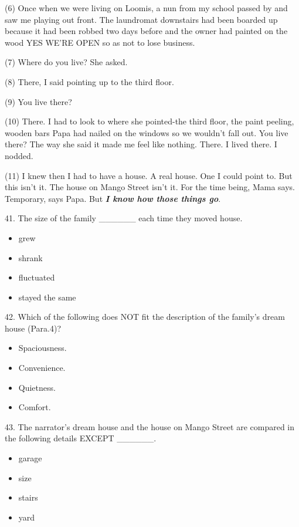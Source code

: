 \documentclass[UTF8,11pt]{ctexart}
\begin{document}
(6) Once when we were living on Loomis, a nun from my school passed by and saw me playing out front. The laundromat downstairs had been boarded up because it had been robbed two days before and the owner had painted on the wood YES WE’RE OPEN so as not to lose business.


(7) Where do you live? She asked.


(8) There, I said pointing up to the third floor.


(9) You live there?


(10) There. I had to look to where she pointed-the third floor, the paint peeling, wooden bars Papa had nailed on the windows so we wouldn’t fall out. You live there? The way she said it made me feel like nothing. There. I lived there. I nodded.


(11) I knew then I had to have a house. A real house. One I could point to. But this isn’t it. The house on Mango Street isn’t it. For the time being, Mama says. Temporary, says Papa. But \textbf{\textit{I know how those things go}}.


41. The size of the family \_\_\_\_\_\_ each time they moved house.


\begin{itemize}[leftmargin=2em,itemsep=.2em,topsep=.4em]\item[A.] grew
\item[B.] shrank
\item[C.] fluctuated
\item[D.] stayed the same
\end{itemize}

42. Which of the following does NOT fit the description of the family’s dream house (Para.4)?


\begin{itemize}[leftmargin=2em,itemsep=.2em,topsep=.4em]\item[A.] Spaciousness.
\item[B.] Convenience.
\item[C.] Quietness.
\item[D.] Comfort.
\end{itemize}

43. The narrator’s dream house and the house on Mango Street are compared in the following details EXCEPT \_\_\_\_\_\_.


\begin{itemize}[leftmargin=2em,itemsep=.2em,topsep=.4em]\item[A.] garage
\item[B.] size
\item[C.] stairs
\item[D.] yard
\end{itemize}
\end{document}

